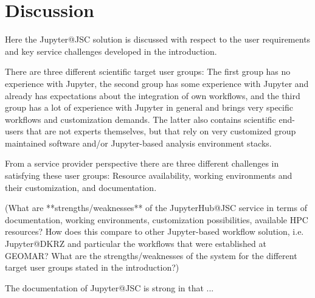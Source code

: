 \section{Discussion}

Here the Jupyter@JSC solution is discussed with respect to the user requirements and key service challenges developed in the introduction.

There are three different scientific target user groups: The first group has no experience with Jupyter, the second group has some experience with Jupyter and already has expectations about the integration of own workflows, and the third group has a lot of experience with Jupyter in general and brings very specific workflows and customization demands.
The latter also contains scientific end-users that are not experts themselves, but that rely on very customized group maintained software and/or Jupyter-based analysis environment stacks.

From a service provider perspective there are three different challenges in satisfying these user groups: Resource availability, working environments and their customization, and documentation.

(What are **strengths/weaknesses** of the JupyterHub@JSC service in terms of documentation, working environments, customization possibilities, available HPC resources? How does this compare to other Jupyter-based workflow solution, i.e. Jupyter@DKRZ and particular the workflows that were established at GEOMAR? What are the strengths/weaknesses of the system for the different target user groups stated in the introduction?)


The documentation of Jupyter@JSC is strong in that ...


